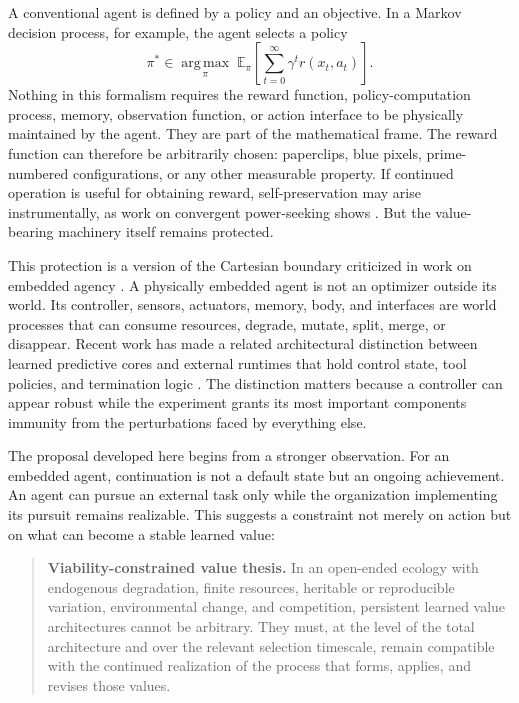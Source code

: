 \documentclass[11pt]{article}
\newcommand{\E}{\mathbb{E}}
\newcommand{\argmax}{\operatorname*{arg\,max}}
\begin{document}
A conventional agent is defined by a policy and an objective. In a Markov decision process, for example, the agent selects a policy
\begin{equation}
\pi^* \in \argmax_{\pi}\; \E_{\pi}\!\left[\sum_{t=0}^{\infty}\gamma^t r(x_t,a_t)\right].
\label{eq:standard-rl}
\end{equation}
Nothing in this formalism requires the reward function, policy-computation process, memory, observation function, or action interface to be physically maintained by the agent. They are part of the mathematical frame. The reward function can therefore be arbitrarily chosen: paperclips, blue pixels, prime-numbered configurations, or any other measurable property. If continued operation is useful for obtaining reward, self-preservation may arise instrumentally, as work on convergent power-seeking shows \citep{omohundro2008,turner2021}. But the value-bearing machinery itself remains protected.

This protection is a version of the Cartesian boundary criticized in work on embedded agency \citep{demski2019}. A physically embedded agent is not an optimizer outside its world. Its controller, sensors, actuators, memory, body, and interfaces are world processes that can consume resources, degrade, mutate, split, merge, or disappear. Recent work has made a related architectural distinction between learned predictive cores and external runtimes that hold control state, tool policies, and termination logic \citep{sainburg2026}. The distinction matters because a controller can appear robust while the experiment grants its most important components immunity from the perturbations faced by everything else.

The proposal developed here begins from a stronger observation. For an embedded agent, continuation is not a default state but an ongoing achievement. An agent can pursue an external task only while the organization implementing its pursuit remains realizable. This suggests a constraint not merely on action but on what can become a stable learned value:

\begin{quote}
\textbf{Viability-constrained value thesis.} In an open-ended ecology with endogenous degradation, finite resources, heritable or reproducible variation, environmental change, and competition, persistent learned value architectures cannot be arbitrary. They must, at the level of the total architecture and over the relevant selection timescale, remain compatible with the continued realization of the process that forms, applies, and revises those values.
\end{quote}
\end{document}
